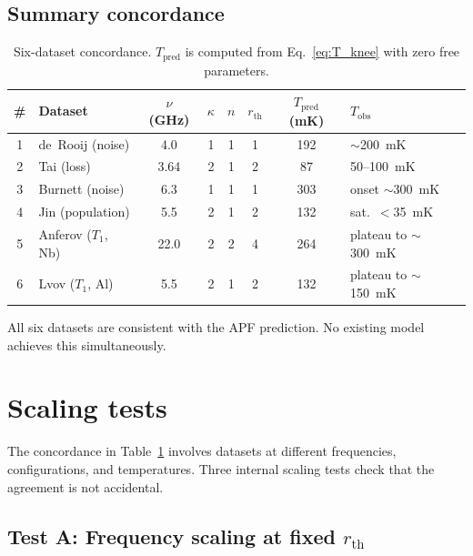 \documentclass[11pt]{article}
\begin{document}
\subsection{Summary concordance}

\begin{table}[h]
\centering
\caption{Six-dataset concordance.  $T_{\mathrm{pred}}$ is computed from Eq.~\eqref{eq:T_knee} with zero free parameters.}
\label{tab:concordance}
\small
\renewcommand{\arraystretch}{1.25}
\begin{tabular}{clcccccl}
\toprule
\# & Dataset & $\nu$ (GHz) & $\kappa$ & $n$ & $r_{\mathrm{th}}$ & $T_{\mathrm{pred}}$ (mK) & $T_{\mathrm{obs}}$ \\
\midrule
1 & de~Rooij (noise) & 4.0 & 1 & 1 & 1 & 192 & $\sim$200~mK \\
2 & Tai (loss) & 3.64 & 2 & 1 & 2 & 87 & 50--100~mK \\
3 & Burnett (noise) & 6.3 & 1 & 1 & 1 & 303 & onset $\sim$300~mK \\
4 & Jin (population) & 5.5 & 2 & 1 & 2 & 132 & sat.\ $<$35~mK \\
5 & Anferov ($T_1$, Nb) & 22.0 & 2 & 2 & 4 & 264 & plateau to $\sim$300~mK \\
6 & Lvov ($T_1$, Al) & 5.5 & 2 & 1 & 2 & 132 & plateau to $\sim$150~mK \\
\bottomrule
\end{tabular}
\end{table}

All six datasets are consistent with the APF prediction.  No existing model achieves this simultaneously.



\section{Scaling tests}

The concordance in Table~\ref{tab:concordance} involves datasets at different frequencies, configurations, and temperatures.  Three internal scaling tests check that the agreement is not accidental.

\subsection{Test A: Frequency scaling at fixed $r_{\mathrm{th}}$}
\end{document}
